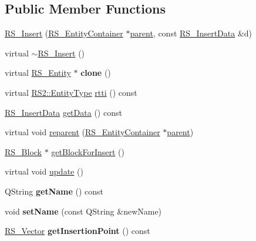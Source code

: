 \subsection*{Public Member Functions}
\begin{DoxyCompactItemize}
\item 
\hyperlink{classRS__Insert_a848d1a6800da6e42bb49a7519dba28ec}{R\-S\-\_\-\-Insert} (\hyperlink{classRS__EntityContainer}{R\-S\-\_\-\-Entity\-Container} $\ast$\hyperlink{classRS__Entity_a80358a8d2fc6739a516a278dc500b49f}{parent}, const \hyperlink{classRS__InsertData}{R\-S\-\_\-\-Insert\-Data} \&d)
\item 
virtual \hyperlink{classRS__Insert_a48a580a0e75b5cab2b8829fedcf155ee}{$\sim$\-R\-S\-\_\-\-Insert} ()
\item 
\hypertarget{classRS__Insert_abae66833cd25bcab624600ff58133dc5}{virtual \hyperlink{classRS__Entity}{R\-S\-\_\-\-Entity} $\ast$ {\bfseries clone} ()}\label{classRS__Insert_abae66833cd25bcab624600ff58133dc5}

\item 
virtual \hyperlink{classRS2_a8f26d1b981e1e85cff16738b43337e6a}{R\-S2\-::\-Entity\-Type} \hyperlink{classRS__Insert_ae980a80a4601f61642cffc8d897febf5}{rtti} () const 
\item 
\hyperlink{classRS__InsertData}{R\-S\-\_\-\-Insert\-Data} \hyperlink{classRS__Insert_abf72fdebceacf50d183538c293aa6c9b}{get\-Data} () const 
\item 
virtual void \hyperlink{classRS__Insert_a4eeb3a70f5c8a73feb4b29912bf00c24}{reparent} (\hyperlink{classRS__EntityContainer}{R\-S\-\_\-\-Entity\-Container} $\ast$\hyperlink{classRS__Entity_a80358a8d2fc6739a516a278dc500b49f}{parent})
\item 
\hyperlink{classRS__Block}{R\-S\-\_\-\-Block} $\ast$ \hyperlink{classRS__Insert_aac29f66e0ee72b5c6043f1d8f2a10986}{get\-Block\-For\-Insert} ()
\item 
virtual void \hyperlink{classRS__Insert_ab61861de798d430c0c07814c4f2fc92d}{update} ()
\item 
\hypertarget{classRS__Insert_aa8ec3704e68cf66e1948e3b542284299}{Q\-String {\bfseries get\-Name} () const }\label{classRS__Insert_aa8ec3704e68cf66e1948e3b542284299}

\item 
\hypertarget{classRS__Insert_a69a8cfcc3fbcfd338f7fa88db9a37fa0}{void {\bfseries set\-Name} (const Q\-String \&new\-Name)}\label{classRS__Insert_a69a8cfcc3fbcfd338f7fa88db9a37fa0}

\item 
\hypertarget{classRS__Insert_a3157c28ab6fe04f1d5e0cb4c0bee0866}{\hyperlink{classRS__Vector}{R\-S\-\_\-\-Vector} {\bfseries get\-Insertion\-Point} () const }\label{classRS__Insert_a3157c28ab6fe04f1d5e0cb4c0bee0866}


\end{DoxyCompactItemize}
